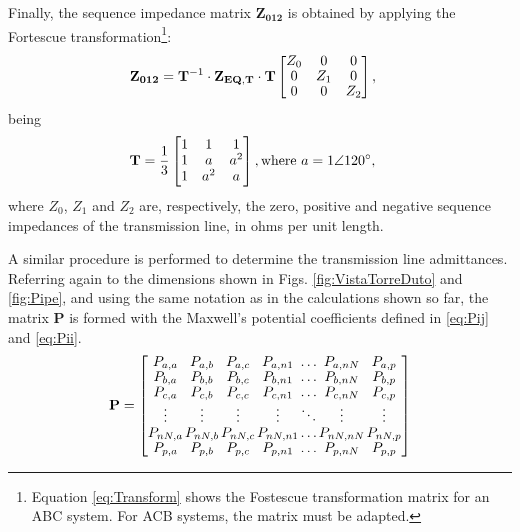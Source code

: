 \documentclass[conference]{IEEEtran}
\begin{document}
Finally, the sequence impedance matrix $\mathbf{Z_{012}}$ is obtained by applying the Fortescue transformation\footnote{Equation \eqref{eq:Transform} shows the Fostescue transformation matrix for an ABC system. For ACB systems, the matrix must be adapted.}:
\begin{equation}\label{eq:MatrizImpSeq}
	\begin{aligned}
		\arraycolsep=0.8pt %
		\medmuskip = -2mu %
		\def\arraystretch{1.2}
		&\mathbf{Z_{012}}
		=\mathbf{T}^{-1}
		\cdot\mathbf{Z_{EQ,T}}\cdot\mathbf{T}
		\begin{bmatrix}
			Z_0 & 0 & 0  \\
			0 & Z_1 & 0 \\
			0 & 0 & Z_2 \\
		\end{bmatrix},
	\end{aligned} 
\end{equation}
being
\begin{equation}\label{eq:Transform}
	\begin{aligned}
		\arraycolsep=0.8pt %
		\medmuskip = -2mu %
		\def\arraystretch{1.2}
		&\mathbf{T}
		=\frac{1}{3}
		\begin{bmatrix}
			1 & 1 & 1  \\
			1 & a & a^2 \\
			1 & a^2 & a \\
		\end{bmatrix}, \textrm{where}~ a=1\angle 120^\circ,
	\end{aligned} 
\end{equation}
where $Z_0$, $Z_1$ and $Z_2$ are, respectively, the zero, positive and negative sequence impedances of the transmission line, in ohms per unit length.

A similar procedure is performed to determine the transmission line admittances. Referring again to the dimensions shown in Figs. \ref{fig:VistaTorreDuto} and \ref{fig:Pipe}, and using the same notation as in the calculations shown so far, the matrix $\mathbf{P}$ is formed with the Maxwell's potential coefficients defined in \eqref{eq:Pij} and \eqref{eq:Pii}.
\begin{equation}\label{eq:MatrizAdm}
	\arraycolsep=0.7pt %
	\medmuskip = -1mu %
	\def\arraystretch{.9}
	\mathbf{P}
	=
	\begin{bmatrix}
		P_{a,a} & P_{a,b} & P_{a,c} & P_{a,n1} & \ldots & P_{a,nN} & P_{a,p}  \\
		P_{b,a} & P_{b,b} & P_{b,c} & P_{b,n1} & \ldots & P_{b,nN} & P_{b,p}  \\
		P_{c,a} & P_{c,b} & P_{c,c} & P_{c,n1} & \ldots & P_{c,nN} & P_{c,p}  \\
		\vdots & \vdots & \vdots & \vdots & \ddots & \vdots & \vdots  \\
		P_{nN,a} & P_{nN,b} & P_{nN,c} & P_{nN,n1} & \ldots & P_{nN,nN} & P_{nN,p}  \\
		P_{p,a} & P_{p,b} & P_{p,c} & P_{p,n1} & \ldots & P_{p,nN} & P_{p,p}
	\end{bmatrix}
\end{equation}
\end{document}

